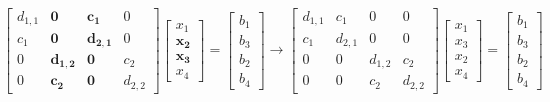 \documentclass{article}
\begin{document}
\begin{equation*}
    \begin{bmatrix}
        d_{1,1}  & \mathbf{0} & \mathbf{c_{1}}  & 0 \\
        c_{1} & \mathbf{0}  & \mathbf{d_{2,1}} & 0  \\
        0 & \mathbf{d_{1,2}} & \mathbf{0} & c_{2}\\
        0 & \mathbf{c_{2}}  & \mathbf{0} & d_{2,2}  
    \end{bmatrix}\begin{bmatrix}
        x_{1} \\ \mathbf{x_{2}} \\ \mathbf{x_{3}} \\ x_{4}
    \end{bmatrix} =
    \begin{bmatrix}
        b_{1} \\ b_{3} \\ b_{2} \\ b_{4}
    \end{bmatrix} \longrightarrow \begin{bmatrix}
        d_{1,1}  & c_{1} & 0  & 0 \\
        c_{1} & d_{2,1}  & 0 & 0  \\
        0 & 0 & d_{1,2} & c_{2}\\
        0 & 0  & c_{2} & d_{2,2}  
    \end{bmatrix}\begin{bmatrix}
        x_{1} \\ x_{3} \\ x_{2} \\ x_{4}
    \end{bmatrix} =
    \begin{bmatrix}
        b_{1} \\ b_{3} \\ b_{2} \\ b_{4}
    \end{bmatrix}
\end{equation*}
\end{document}
